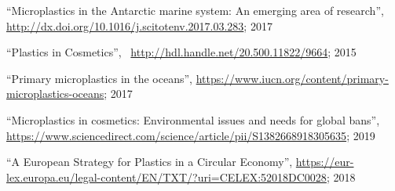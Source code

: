 \documentclass{article}
\begin{document}
\begin{thebibliography}{1}
        ``Microplastics in the Antarctic marine system: An emerging area of research'',
        \url{http://dx.doi.org/10.1016/j.scitotenv.2017.03.283}; 2017

        ``Plastics in Cosmetics'', \
        \url{http://hdl.handle.net/20.500.11822/9664}; 2015

        ``Primary microplastics in the oceans'', 
        \url{https://www.iucn.org/content/primary-microplastics-oceans}; 2017

        ``Microplastics in cosmetics: Environmental issues and needs for global bans'', 
        \url{https://www.sciencedirect.com/science/article/pii/S1382668918305635}; 2019

        ``A European Strategy for Plastics in a Circular Economy'', 
        \url{https://eur-lex.europa.eu/legal-content/EN/TXT/?uri=CELEX:52018DC0028}; 2018
\end{thebibliography}
\end{document}
